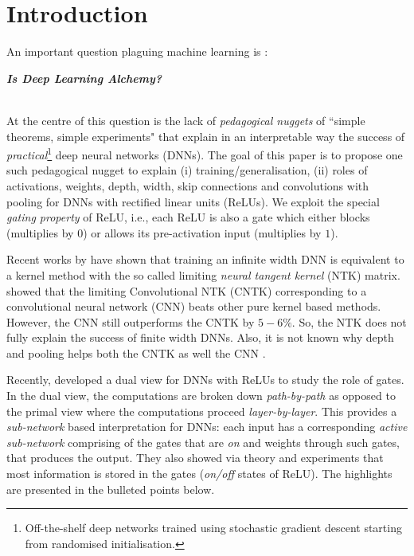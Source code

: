 \section{Introduction}\label{sec:intro}
An important question plaguing machine learning is \cite{BenAli-1,Lecun,BenAli-2,Aliresponse,Mickens}:\\
{\centerline{\textbf{\emph{Is Deep Learning Alchemy?}}}}\\
At the centre of this question is the lack of \emph{pedagogical nuggets} of ``simple theorems, simple experiments" \cite{Aliresponse} that explain in an interpretable way the success of \emph{practical}\footnote{Off-the-shelf deep networks trained using stochastic gradient descent starting from randomised initialisation.} deep neural networks (DNNs). The goal of this paper is to propose one such pedagogical nugget to explain (i) training/generalisation, (ii) roles of activations, weights, depth, width, skip connections and convolutions with pooling for DNNs with rectified linear units (ReLUs). We exploit the special \emph{gating property} of ReLU, i.e., each ReLU is also a gate which either blocks (multiplies by $0$) or allows its pre-activation input (multiplies by $1$). 

Recent works by \citet{arora2019exact, ntk,cao2019generalization} have shown that training an infinite width DNN is equivalent to a kernel method with the so called limiting \emph{neural tangent kernel} (NTK) matrix. \citet{arora2019exact} showed that the limiting Convolutional NTK (CNTK) corresponding to a convolutional neural network (CNN) beats other pure kernel based methods. However, the CNN still outperforms the CNTK by $5-6\%$. So, the NTK does not fully explain the success of finite width DNNs. Also, it is not known why depth and pooling helps both the CNTK as well the CNN \cite{arora2019exact}.

Recently, \citet{npk} developed a dual view for DNNs with ReLUs to study the role of gates. In the dual view, the computations are broken down \emph{path-by-path} as opposed to the primal view where the computations proceed \emph{layer-by-layer}. This provides a \emph{sub-network} based interpretation for DNNs: each input has a corresponding \emph{active sub-network} comprising of the gates that are \emph{on} and weights through such gates, that produces the output. They also showed via theory and experiments that most information is stored in the gates (\emph{on/off} states of ReLU). The highlights are presented in the bulleted points below.

